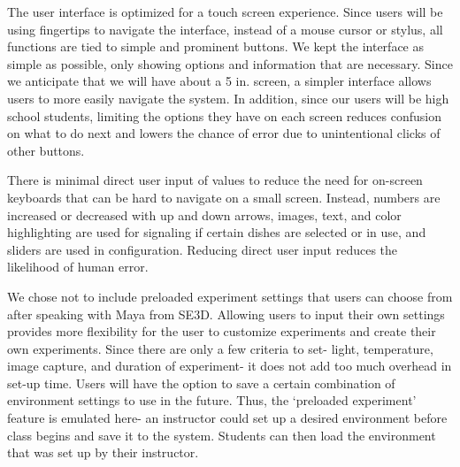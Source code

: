 The user interface is optimized for a touch screen experience. Since users will be using fingertips to navigate the interface, instead of a mouse cursor or stylus, all functions are tied to simple and prominent buttons. We kept the interface as simple as possible, only showing options and information that are necessary. Since we anticipate that we will have about a 5 in. screen, a simpler interface allows users to more easily navigate the system. In addition, since our users will be high school students, limiting the options they have on each screen reduces confusion on what to do next and lowers the chance of error due to unintentional clicks of other buttons.

There is minimal direct user input of values to reduce the need for on-screen keyboards that can be hard to navigate on a small screen. Instead, numbers are increased or decreased with up and down arrows, images, text, and color highlighting are used for signaling if certain dishes are selected or in use, and sliders are used in configuration. Reducing direct user input reduces  the likelihood of human error.

We chose not to include preloaded experiment settings that users can choose from after speaking with Maya from SE3D. Allowing users to input their own settings provides more flexibility for the user to customize experiments and create their own experiments. Since there are only a few criteria to set- light, temperature, image capture, and duration of experiment- it does not add too much overhead in set-up time. Users will have the option to save a certain combination of environment settings to use in the future. Thus, the `preloaded experiment' feature is emulated here- an instructor could set up a desired environment before class begins and save it to the system. Students can then load the environment that was set up by their instructor. 


